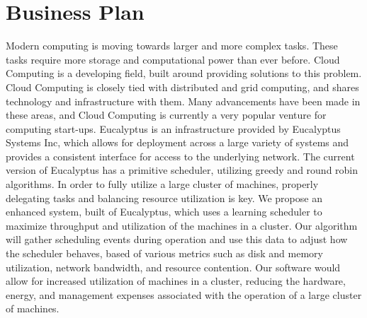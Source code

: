 \section{Business Plan}
  Modern computing is moving towards larger and more complex tasks.  These tasks
  require more storage and computational power than ever before.  Cloud
  Computing is a developing field, built around providing solutions to this
  problem.  Cloud Computing is closely tied with distributed and grid computing,
  and shares technology and infrastructure with them.  Many advancements have
  been made in these areas, and Cloud Computing is currently a very popular
  venture for computing start-ups.  Eucalyptus is an infrastructure provided by
  Eucalyptus Systems Inc, which allows for deployment across a large variety of
  systems and provides a consistent interface for access to the underlying
  network.  The current version of Eucalyptus has a primitive scheduler,
  utilizing greedy and round robin algorithms.  In order to fully utilize a
  large cluster of machines, properly delegating tasks and balancing resource
  utilization is key.  We propose an enhanced system, built of Eucalyptus, which
  uses a learning scheduler to maximize throughput and utilization of the
  machines in a cluster.  Our algorithm will gather scheduling events during
  operation and use this data to adjust how the scheduler behaves, based of
  various metrics such as disk and memory utilization, network bandwidth, and
  resource contention.  Our software would allow for increased utilization of
  machines in a cluster, reducing the hardware, energy, and management expenses
  associated with the operation of a large cluster of machines.
